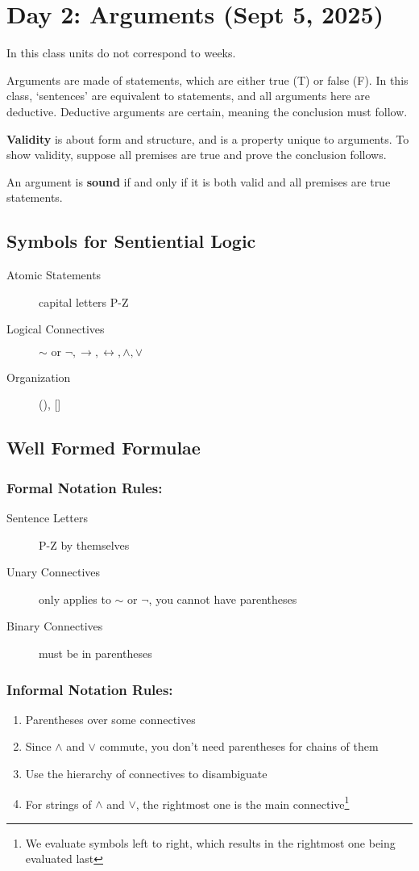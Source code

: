 \section{Day 2: Arguments (Sept 5, 2025)}

In this class units do not correspond to weeks.

Arguments are made of statements, which are either true (T) or false (F). In this class, `sentences' are equivalent to statements, and all arguments here are deductive. Deductive arguments are certain, meaning the conclusion must follow.

\textbf{Validity} is about form and structure, and is a property unique to arguments. To show validity, suppose all premises are true and prove the conclusion follows.

An argument is \textbf{sound} if and only if it is both valid and all premises are true statements.

\subsection{Symbols for Sentiential Logic}
\begin{description}
    \item[Atomic Statements] capital letters P-Z
    \item[Logical Connectives] $\sim \text{ or } \neg, \to , \leftrightarrow, \wedge, \vee$
    \item[Organization] {(), []}
\end{description}

\subsection{Well Formed Formulae}
\subsubsection*{Formal Notation Rules:}
\begin{description}
    \item[Sentence Letters] P-Z by themselves
    \item[Unary Connectives] only applies to $\sim$ or $\neg$, you cannot have parentheses
    \item[Binary Connectives] must be in parentheses
\end{description}
\subsubsection*{Informal Notation Rules:}
\begin{enumerate}
\item Parentheses over some connectives
\item Since $\wedge$ and $\vee$ commute, you don't need parentheses for chains of them
\item Use the hierarchy of connectives to disambiguate
    \item For strings of $\wedge$ and $\vee$, the rightmost one is the main connective\footnote{We evaluate symbols left to right, which results in the rightmost one being evaluated last}
\end{enumerate}

